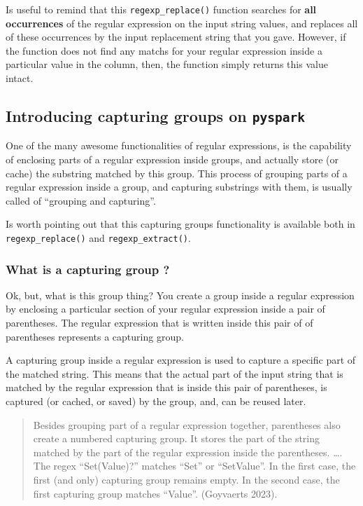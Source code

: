 \documentclass[
  11pt,
  letterpaper,
  DIV=11,
  numbers=noendperiod]{scrreprt}
\begin{document}
Is useful to remind that this \texttt{regexp\_replace()} function
searches for \textbf{all occurrences} of the regular expression on the
input string values, and replaces all of these occurrences by the input
replacement string that you gave. However, if the function does not find
any matchs for your regular expression inside a particular value in the
column, then, the function simply returns this value intact.

\hypertarget{introducing-capturing-groups-on-pyspark}{%
\subsection{\texorpdfstring{Introducing capturing groups on
\texttt{pyspark}}{Introducing capturing groups on pyspark}}\label{introducing-capturing-groups-on-pyspark}}

One of the many awesome functionalities of regular expressions, is the
capability of enclosing parts of a regular expression inside groups, and
actually store (or cache) the substring matched by this group. This
process of grouping parts of a regular expression inside a group, and
capturing substrings with them, is usually called of ``grouping and
capturing''.

Is worth pointing out that this capturing groups functionality is
available both in \texttt{regexp\_replace()} and
\texttt{regexp\_extract()}.

\hypertarget{what-is-a-capturing-group}{%
\subsubsection{What is a capturing group
?}\label{what-is-a-capturing-group}}

Ok, but, what is this group thing? You create a group inside a regular
expression by enclosing a particular section of your regular expression
inside a pair of parentheses. The regular expression that is written
inside this pair of of parentheses represents a capturing group.

A capturing group inside a regular expression is used to capture a
specific part of the matched string. This means that the actual part of
the input string that is matched by the regular expression that is
inside this pair of parentheses, is captured (or cached, or saved) by
the group, and, can be reused later.

\begin{quote}
Besides grouping part of a regular expression together, parentheses also
create a numbered capturing group. It stores the part of the string
matched by the part of the regular expression inside the parentheses.
\ldots. The regex ``Set(Value)?'' matches ``Set'' or ``SetValue''. In
the first case, the first (and only) capturing group remains empty. In
the second case, the first capturing group matches ``Value''. (Goyvaerts
2023).
\end{quote}
\end{document}
